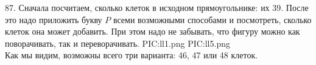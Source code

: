 87. Сначала посчитаем, сколько клеток в исходном прямоугольнике: их 39. После это надо приложить букву $P$ всеми возможными способами и посмотреть, сколько клеток она может добавить. При этом надо не забывать, что фигуру можно как поворачивать, так и переворачивать.
{{PIC:ll1.png}}
{{PIC:ll5.png}}\\
Как мы видим, возможны всего три варианта: 46, 47 или 48 клеток.\\

